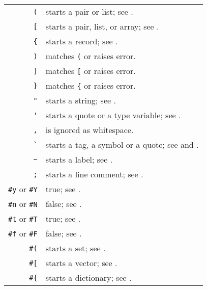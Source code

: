 \begin{table}
\begin{longtable}{ r l }
  \lstinline!(! & starts a pair or list; see \nameref{subsec:aml-base-lang-reader-lists}. \\
  \lstinline![! & starts a pair, list, or array; see \nameref{subsec:aml-base-lang-reader-lists}. \\
  \lstinline!{! & starts a record; see \nameref{subsec:aml-base-lang-reader-records}. \\
  \lstinline!)! & matches \lstinline!(! or raises error. \\
  \lstinline!]! & matches \lstinline![! or raises error. \\
  \lstinline!}! & matches \lstinline!{! or raises error. \\
  
\pagebreak[2]
  \lstinline!"! & starts a string; see \nameref{subsec:aml-base-lang-reader-strings}. \\
  \lstinline!'! & starts a quote or a type variable; see \nameref{subsec:aml-base-lang-reader-quotes}. \\
  \lstinline!,! & is ignored as whitespace. \\
  \lstinline!`! & starts a tag, a symbol or a quote; see \nameref{subsec:aml-base-lang-reader-polytags} and \nameref{subsec:aml-base-lang-reader-symbols}. \\
  \lstinline!~! & starts a label; see \nameref{subsec:aml-base-lang-reader-labels}. \\
  \lstinline!;! & starts a line comment; see \nameref{subsec:aml-base-lang-reader-comments}. \\
  
\pagebreak[2]
  \lstinline!#y! or \lstinline!#Y! & true; see \nameref{subsec:aml-base-lang-reader-booleans}. \\
  \lstinline!#n! or \lstinline!#N! & false; see \nameref{subsec:aml-base-lang-reader-booleans}. \\
  \lstinline!#t! or \lstinline!#T! & true; see \nameref{subsec:aml-base-lang-reader-booleans}. \\
  \lstinline!#f! or \lstinline!#F! & false; see \nameref{subsec:aml-base-lang-reader-booleans}. \\  
  
  \lstinline!#(! & starts a set; see \nameref{subsec:aml-base-lang-reader-sets}. \\
  \lstinline!#[! & starts a vector; see \nameref{subsec:aml-base-lang-reader-vectors}. \\
  \lstinline!#{! & starts a dictionary; see \nameref{subsec:aml-base-lang-reader-dictionaries}. \\
  

\end{longtable}
\end{table}
